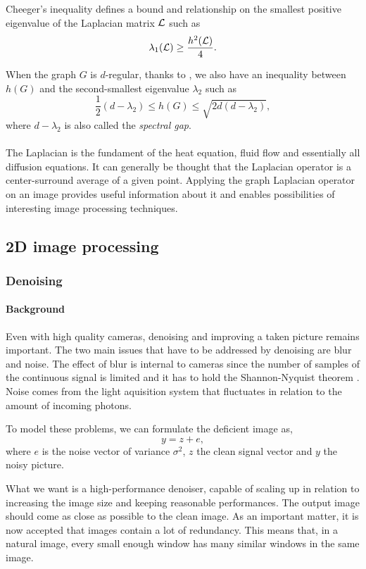Cheeger's inequality defines a bound and relationship on the smallest positive eigenvalue of the Laplacian matrix \(\operatorname{\mathcal{L}} \) such as
\[\lambda_1(\operatorname{\mathcal{L}}) \ge \frac{h^2(\operatorname{\mathcal{L}})}{4}.\]

When the graph \(G\) is \(d\)-regular, thanks to \cite{cvetkovic_spectra_1980}, we also have an inequality between \(h(G)\) and the second-smallest eigenvalue \(\lambda_2\) such as
\[\frac{1}{2}(d-\lambda_2) \le h(G) \le \sqrt{2d(d-\lambda_2)},\]
where \(d - \lambda_2\) is also called the \textit{spectral gap}.

\paragraph{}
The Laplacian is the fundament of the heat equation, fluid flow and essentially all diffusion equations.
It can generally be thought that the Laplacian operator is a center-surround average \cite{siam_slides_2016} of a given point.
Applying the graph Laplacian operator on an image provides useful information about it and enables possibilities of interesting image processing techniques.

\subsection{2D image processing}

\subsubsection{Denoising}

\paragraph{Background}
Even with high quality cameras, denoising and improving a taken picture remains important.
The two main issues that have to be addressed by denoising are blur and noise.
The effect of blur is internal to cameras since the number of samples of the continuous signal is limited and it has to hold the Shannon-Nyquist theorem \cite{buades_review_2005}.
Noise comes from the light aquisition system that fluctuates in relation to the amount of incoming photons.

To model these problems, we can formulate the deficient image as,
\[y = z + e,\]
where \(e\) is the noise vector of variance \(\sigma^2\), \(z\) the clean signal vector and \(y\) the noisy picture.

What we want is a high-performance denoiser, capable of scaling up in relation to increasing the image size and keeping reasonable performances.
The output image should come as close as possible to the clean image.
As an important matter, it is now accepted that images contain a lot of redundancy.
This means that, in a natural image, every small enough window has many similar windows in the same image.

